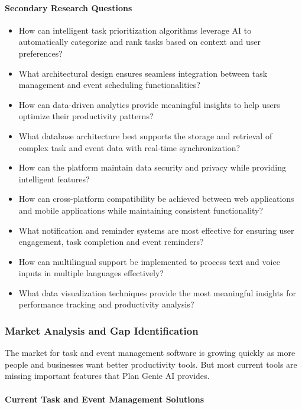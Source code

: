 \documentclass[12pt,a4paper]{article}
\begin{document}
\paragraph{Secondary Research Questions}

\begin{itemize}
    \item How can intelligent task prioritization algorithms leverage AI to automatically categorize and rank tasks based on context and user preferences?
    \item What architectural design ensures seamless integration between task management and event scheduling functionalities?
    \item How can data-driven analytics provide meaningful insights to help users optimize their productivity patterns?
    \item What database architecture best supports the storage and retrieval of complex task and event data with real-time synchronization?
    \item How can the platform maintain data security and privacy while providing intelligent features?
    \item How can cross-platform compatibility be achieved between web applications and mobile applications while maintaining consistent functionality?
    \item What notification and reminder systems are most effective for ensuring user engagement, task completion and event reminders?
    \item How can multilingual support be implemented to process text and voice inputs in multiple languages effectively?
    \item What data visualization techniques provide the most meaningful insights for performance tracking and productivity analysis?
\end{itemize}

\subsubsection{Market Analysis and Gap Identification}

The market for task and event management software is growing quickly as more people and businesses want better productivity tools. But most current tools are missing important features that Plan Genie AI provides.

\paragraph{Current Task and Event Management Solutions}
\end{document}

